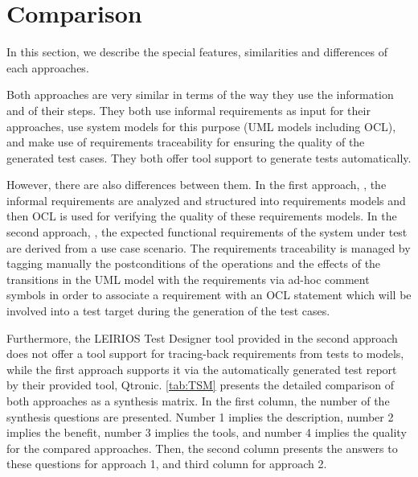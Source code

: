 \section{Comparison}
\label{sec:Compar}

In this section, we describe the special features, similarities and differences of each approaches.

Both approaches are very similar in terms of the way they use the information and of their steps. They both use informal requirements as input for their approaches, use system models for this purpose (UML models including OCL), and make use of requirements traceability for ensuring the quality of the generated test cases. They both offer tool support to generate tests automatically. 

However, there are also differences between them. In the first approach, \cite{Paper1}, the informal requirements are analyzed and structured into requirements models and then OCL is used for verifying the quality of these requirements models.
In the second approach, \cite{Paper2}, the expected functional requirements of the system under test are derived from a use case scenario. The requirements traceability is managed by tagging manually the postconditions of the operations and the effects of the transitions in the UML model with the requirements via ad-hoc comment symbols in order to associate a requirement with an OCL statement which will be involved into a test target during the generation of the test cases.

Furthermore, the LEIRIOS Test Designer tool provided in the second approach does not offer a tool support for tracing-back requirements from tests to models, while the first approach supports it via the automatically generated test report by their provided tool, Qtronic.
\newpage
\autoref{tab:TSM} presents the detailed comparison of both approaches as a synthesis matrix. In the first column, the number of the synthesis questions are presented. Number 1 implies the description, number 2 implies the benefit, number 3 implies the tools, and number 4 implies the quality for the compared approaches. Then, the second column presents the answers to these questions for approach 1, and third column for approach 2. 


